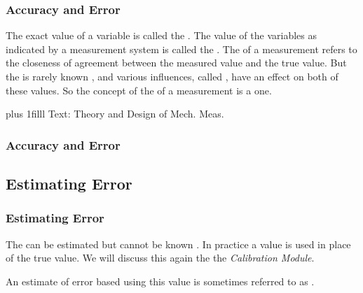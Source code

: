 \documentclass[fleqn]{beamer} %
\newcommand{\sectionIsubsectionItitle}{Accuracy and Error}
\newcommand{\sectionIsubsectionIItitle}{Estimating Error}
\newcommand{\btVFill}{\vskip0pt plus 1filll}
\begin{document}
			\begin{frame}
				\frametitle{\sectionIsubsectionItitle}

				\bigskip		
				The exact value of a variable is called the \hspcu \hspc \hspcu. The value of the variables as indicated by a
				measurement system is called the \hspcu \hspc \hspcu. The \hspcu of a measurement refers to the
				closeness of agreement between the measured value and the true value. But the \hspcu \hspc \hspcu is rarely
				known \hspcu, and various influences, called \hspcu, have an effect on both of these values. So the
				concept of the \hspcu of a measurement is a \hspcu one. \vspcc

				\begin{framed}
				\end{framed}

				\btVFill
				{\tiny Text: Theory and Design of Mech. Meas.}
							
			\end{frame}

			\begin{frame}
				\frametitle{\sectionIsubsectionItitle}

				
					
			\end{frame}

		\subsection{\sectionIsubsectionIItitle}\label{sectionIsubsectionII}

			\begin{frame}
				\frametitle{\sectionIsubsectionIItitle}

				The \hspcu \hspc \hspcu can be estimated but cannot be known  \hspcu. In practice a \hspcu value is used in place of the true value. We will discuss this again the the {\it Calibration Module}.

				\begin{framed}%
				\end{framed}

				An estimate of error based using this value is sometimes referred to as \hspcu \hspc \hspcu. \vspc
						

		
			\end{frame}
\end{document}
